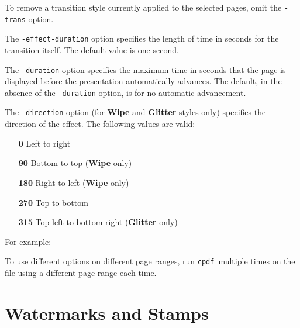 \documentclass{book}
\newcommand{\cpdf}{\texttt{cpdf}}
\begin{document}
\noindent To remove a transition style currently applied to the selected pages,
omit the \texttt{-trans} option.

The \texttt{-effect-duration} option specifies the length of time in seconds
for the transition itself. The default value is one second.

The \texttt{-duration} option specifies the maximum time in seconds that the
page is displayed before the presentation automatically advances. The default,
in the absence of the \texttt{-duration} option, is for no automatic
advancement.

The \texttt{-direction} option (for \textbf{Wipe} and \textbf{Glitter} styles
only) specifies the direction of the effect. The following values are valid:
\begin{itemize}
  \item[\textbf{0}] Left to right
  \item[\textbf{90}] Bottom to top (\textbf{Wipe} only)
  \item[\textbf{180}] Right to left (\textbf{Wipe} only)
  \item[\textbf{270}] Top to bottom
  \item[\textbf{315}] Top-left to bottom-right (\textbf{Glitter} only)
\end{itemize}

\noindent For example:

\noindent{}

\noindent To use different options on different page ranges, run \cpdf\ multiple times on
the file using a different page range each time.


\chapter{Watermarks and Stamps}
\label{stamps}
\end{document}

